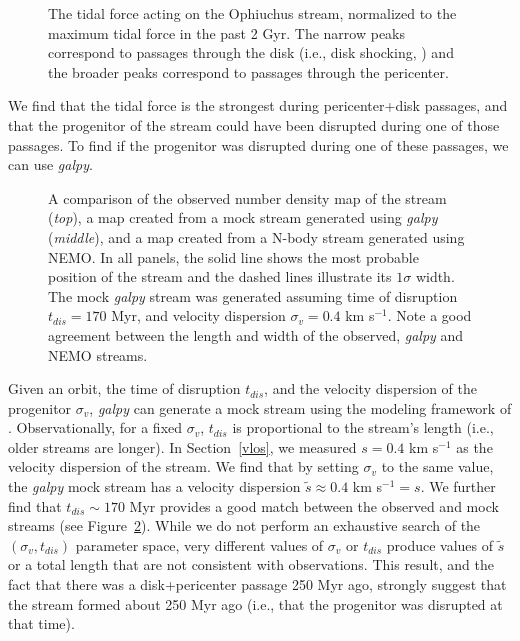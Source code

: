 \documentclass[iop]{emulateapj}
\begin{document}
\begin{figure}
\caption{
The tidal force acting on the Ophiuchus stream, normalized to the maximum tidal
force in the past 2 Gyr. The narrow peaks correspond to passages through the
disk (i.e., disk shocking, \citealt{osc72}) and the broader peaks correspond to
passages through the pericenter.
\label{tidal_force}}
\end{figure}

We find that the tidal force is the strongest during pericenter+disk passages,
and that the progenitor of the stream could have been disrupted during one of
those passages. To find if the progenitor was disrupted during one of these
passages, we can use {\em galpy}.

\begin{figure}


\caption{
A comparison of the observed number density map of the stream ({\em top}), a map
created from a mock stream generated using {\em galpy} ({\em middle}), and a map
created from a N-body stream generated using NEMO. In all panels, the solid line
shows the most probable position of the stream and the dashed lines illustrate
its $1\sigma$ width. The mock {\em galpy} stream was generated assuming time of
disruption $t_{dis}=170$ Myr, and velocity dispersion $\sigma_{v}=0.4$ km
s$^{-1}$. Note a good agreement between the length and width of the observed,
{\em galpy} and NEMO streams.
\label{observed_vs_mock_comparison}}
\end{figure}

Given an orbit, the time of disruption $t_{dis}$, and the velocity dispersion of
the progenitor $\sigma_v$, {\em galpy} can generate a mock stream using the
modeling framework of \citet{bov14}. Observationally, for a fixed $\sigma_v$,
$t_{dis}$ is proportional to the stream's length (i.e., older streams are
longer). In Section~\ref{vlos}, we measured $s=0.4$ km s$^{-1}$ as the velocity
dispersion of the stream. We find that by setting $\sigma_v$ to the same value,
the {\em galpy} mock stream has a velocity dispersion $\tilde{s} \approx 0.4$ km
s$^{-1} = s$. We further find that $t_{dis}\sim170$ Myr provides a good match
between the observed and mock streams (see
Figure~\ref{observed_vs_mock_comparison}). While we do not perform an exhaustive
search of the $(\sigma_v,t_{dis})$ parameter space, very different values of
$\sigma_v$ or $t_{dis}$ produce values of $\tilde{s}$ or a total length that are
not consistent with observations. This result, and the fact that there was a
disk+pericenter passage 250 Myr ago, strongly suggest that the stream formed
about 250 Myr ago (i.e., that the progenitor was disrupted at that time).
\end{document}
